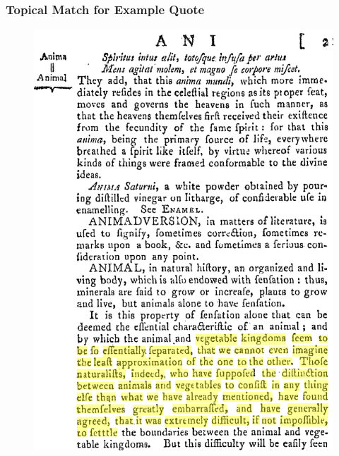 \documentclass[pdf]{beamer}
\begin{document}
\begin{frame}
  \frametitle{Topical Match for Example Quote}
  \begin{figure}[htbp]
    \centering
    \includegraphics[width=\linewidth,height=0.8\textheight,keepaspectratio]{images/topical_match.png}
  \end{figure}

\end{frame}
\end{document}
